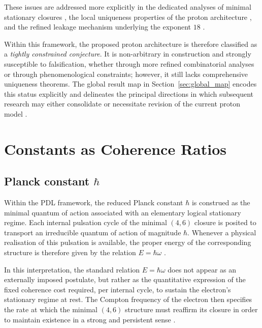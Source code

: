 \documentclass{article}
\begin{document}
These issues are addressed more explicitly in the dedicated analyses of minimal stationary closures \cite{Minimal_Stationary_Closures_2026}, the local uniqueness properties of the proton architecture \cite{Proton_Local_Uniqueness_2026,Combinatorial_Proton_v2_2026}, and the refined leakage mechanism underlying the exponent $18$ \cite{Coherence_Leakage_18_2026,Exponent_18_PDL_2026}.

Within this framework, the proposed proton architecture is therefore classified as a \emph{tightly constrained conjecture}. It is non-arbitrary in construction and strongly susceptible to falsification, whether through more refined combinatorial analyses or through phenomenological constraints; however, it still lacks comprehensive uniqueness theorems. The global result map in Section~\ref{sec:global_map} encodes this status explicitly and delineates the principal directions in which subsequent research may either consolidate or necessitate revision of the current proton model \cite{PDL_position}.

\section{Constants as Coherence Ratios}
\label{sec:constants}

\subsection{Planck constant \texorpdfstring{\(\hbar\)}{hbar}}
\label{subsec:hbar}

Within the PDL framework, the reduced Planck constant \(\hbar\) is construed as the minimal quantum of action associated with an elementary logical stationary regime. Each internal pulsation cycle of the minimal \((4,6)\) closure is posited to transport an irreducible quantum of action of magnitude \(\hbar\). Whenever a physical realisation of this pulsation is available, the proper energy of the corresponding structure is therefore given by the relation \(E = \hbar \omega\)
\cite{PDL_Main_2026,PDL_intro}.

In this interpretation, the standard relation \(E = \hbar \omega\) does not appear as an externally imposed postulate, but rather as the quantitative expression of the fixed coherence cost required, per internal cycle, to sustain the electron’s stationary regime at rest. The Compton frequency of the electron then specifies the rate at which the minimal \((4,6)\) structure must reaffirm its closure in order to maintain existence in a strong and persistent sense
\cite{PDL_Main_2026,PDL_position}.
\end{document}
